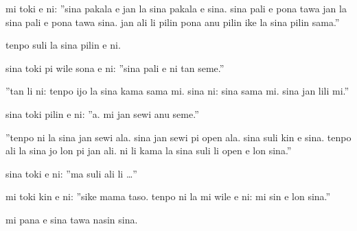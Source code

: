 \documentclass{article}
\begin{document}
mi toki e ni: ''sina pakala e jan la sina pakala e sina. sina pali e pona tawa jan la sina pali e pona tawa sina. jan ali li pilin pona anu pilin ike la sina pilin sama.''

tenpo suli la sina pilin e ni.

sina toki pi wile sona e ni: ''sina pali e ni tan seme.''

''tan li ni: tenpo ijo la sina kama sama mi. sina ni: sina sama mi. sina jan lili mi.''

sina toki pilin e ni: ''a. mi jan sewi anu seme.''

''tenpo ni la sina jan sewi ala. sina jan sewi pi open ala. sina suli kin e sina. tenpo ali la sina jo lon pi jan ali. ni li kama la sina suli li open e lon sina.''

sina toki e ni: ''ma suli ali li …''

mi toki kin e ni: ''sike mama taso. tenpo ni la mi wile e ni: mi sin e lon sina.''

mi pana e sina tawa nasin sina.
\end{document}
